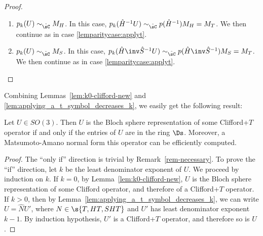 \documentclass{article}
\begin{document}
\begin{proof}
\begin{enumerate}
      Now consider the third column $w$ of $U$, where $p_k(w) =
      (0,0,0)^T$. Then $k-1$ is a denominator exponent for $w$, so that
      $k$ is a denominator exponent for $\hat{T}^{-1}w$. Let
      \[ p_k(\hat{T}^{-1}w) = \zmatrix{c}{x\\y\\z}.
      \]
      As the least denominator exponent of the other two columns of
      $p_k(\hat{T}^{-1}U)$ is $k-1$, we have
      \[p_k(\hat{T}^{-1}U) \sim_{\hat\sC}
      \begin{pmatrix} 0&0&x \\0&0&y \\0&0&z\end{pmatrix}.
      \]
      But $\hat{T}^{-1}U$ is orthogonal, so by {\eqref{eqn-a2c2}},
      applied to each row of $\hat{T}^{-1}U$, we conclude that
      $x=y=z=0$. It follows that the least denominator exponent of
      $\hat{T}^{-1}U$ is $k-1$.
    \item \label{lemparitycase:applyh}$p_k(U) \sim_{\hat\sC} M_H$.
      In this case, $p_k(\hat{H}^{-1}U) \sim_{\hat\sC} p(\hat{H}^{-1})M_H = M_T$.
      We then continue as in case {\ref{lemparitycase:applyt}}.
    \item \label{lemparitycase:applys}$p_k(U) \sim_{\hat\sC} M_S$.
      In this case, $p_k(\hat{H}\inv\hat{S}^{-1}U) \sim_{\hat\sC} p(\hat{H}\inv\hat{S}^{-1})M_S = M_T$.
      We then continue as in case {\ref{lemparitycase:applyt}}.\qedhere
  \end{enumerate}
\end{proof}

Combining Lemmas~\ref{lem:k0-clifford-new} and
{\ref{lem:applying_a_t_symbol_decreases_k}}, we easily get the
following result:

\begin{theorem}\label{thm:completness_of_algorithm}
  Let $U\in SO(3)$. Then $U$ is the Bloch sphere representation of
  some Clifford+$T$ operator if and only if the entries of $U$ are in
  the ring $\Ds$. Moreover, a Matsumoto-Amano normal form this
  operator can be efficiently computed.
\end{theorem}

\begin{proof}
  The ``only if'' direction is trivial by Remark~\ref{rem-necessary}.
  To prove the ``if'' direction, let $k$ be the least denominator
  exponent of $U$. We proceed by induction on $k$. If $k=0$, by
  Lemma~\ref{lem:k0-clifford-new}, $U$ is the Bloch sphere representation
  of some Clifford operator, and therefore of a Clifford+$T$ operator. If
  $k>0$, then by
  Lemma~\ref{lem:applying_a_t_symbol_decreases_k}, we can write
  $U=\hat NU'$, where $N\in\s{T,HT,SHT}$ and $U'$ has least
  denominator exponent $k-1$. By induction hypothesis, $U'$ is a
  Clifford+$T$ operator, and therefore so is $U$.
\end{proof}
\end{document}
